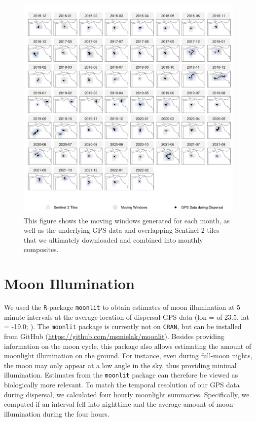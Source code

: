 \documentclass[../FinalThesis.tex]{subfiles}
\begin{document}
\begin{figure}[htpb]
 \begin{center}
  \includegraphics[width = \textwidth]{Figures/MovingWindows2.png}
  \caption{This figure shows the moving windows generated for each month, as
  well as the underlying GPS data and overlapping Sentinel 2 tiles that we
  ultimately downloaded and combined into monthly composites.}
  \label{MovingWindows2}
 \end{center}
\end{figure}

\newpage
\section{Moon Illumination}

We used the \texttt{R}-package \texttt{moonlit} \citep{Smielak.2023} to obtain
estimates of moon illumination at 5 minute intervals at the average location of
dispersal GPS data (lon = of 23.5, lat = -19.0; ). The
\texttt{moonlit} package is currently not on \texttt{CRAN}, but can be installed
from GitHub (\url{https://github.com/msmielak/moonlit}). Besides providing
information on the moon cycle, this package also allows estimating the amount of
moonlight illumination on the ground. For instance, even during full-moon
nights, the moon may only appear at a low angle in the sky, thus providing
minimal illumination. Estimates from the \texttt{moonlit} package can therefore
be viewed as biologically more relevant. To match the temporal resolution of our
GPS data during dispersal, we calculated four hourly moonlight summaries.
Specifically, we computed if an interval fell into nighttime and the average
amount of moon-illumination during the four hours.
\end{document}
